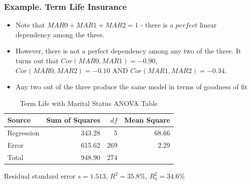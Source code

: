\begin{frame}
 \frametitle{Example. Term Life Insurance}
  \begin{itemize}
   \item Note that $MAR0 + MAR1 + MAR2 = 1$ - there is a $perfect$
   linear dependency among the three.
   \item However, there is not a perfect dependency among any two of
   the three. It turns out that $Cor(MAR0,MAR1) = -0.90$, $Cor(MAR0,MAR2) =
   -0.10$ AND $Cor(MAR1,MAR2) = -0.34$.
   \item Any two out of the three produce the same model in terms of
   goodness of fit
   \end{itemize}
\begin{table}
 \caption{Term Life with Marital Status ANOVA Table}
\begin{tabular}{lrrr}
 \hline Source
& Sum of Squares & $df$ & Mean Square \\ \hline

Regression & 343.28 & 5 &   68.66 \\
Error      & 615.62 & 269 &  2.29 \\
Total      & 948.90& 274 &   \\ \hline
\end{tabular}

Residual standard error $s= 1.513$, $R^2 = 35.8\%$, $R_a^2 = 34.6\%$
\end{table}
\end{frame}

